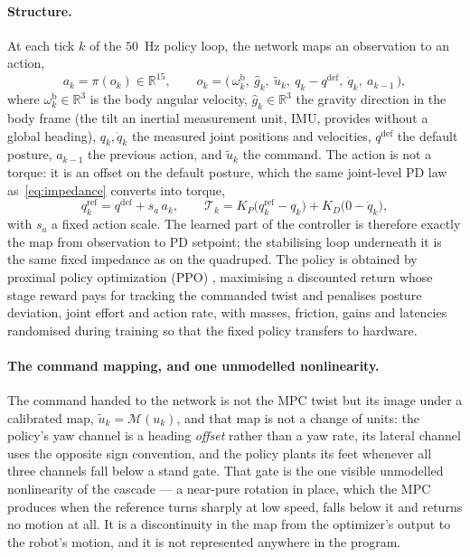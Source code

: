 \documentclass[11pt,a4paper]{article}
\newcommand{\R}{\mathbb{R}}
\newcommand{\qdef}{q^{\mathrm{def}}}
\begin{document}
\paragraph{Structure.} At each tick $k$ of the $50$~Hz policy loop, the network maps an observation to an
action,
\begin{equation}
  a_k=\pi(o_k)\in\R^{15},
  \qquad
  o_k=\big(\,\omega^{\mathrm{b}}_k,\ \hat g_k,\ \tilde u_k,\ q_k-\qdef,\ \dot q_k,\ a_{k-1}\,\big),
  \label{eq:rlpolicy}
\end{equation}
where $\omega^{\mathrm{b}}_k\in\R^3$ is the body angular velocity, $\hat g_k\in\R^3$ the gravity direction in
the body frame (the tilt an inertial measurement unit, IMU, provides without a global heading), $q_k,\dot q_k$ the
measured joint positions and velocities, $\qdef$ the default posture, $a_{k-1}$ the previous action, and
$\tilde u_k$ the command. The action is not a torque: it is an offset on the default posture, which the same
joint-level PD law as~\eqref{eq:impedance} converts into torque,
\begin{equation}
  q_k^{\mathrm{ref}}=\qdef+s_a\,a_k,
  \qquad
  \mathcal{T}_k=K_P\big(q_k^{\mathrm{ref}}-q_k\big)+K_D\big(0-\dot q_k\big),
  \label{eq:rlpd}
\end{equation}
with $s_a$ a fixed action scale. The learned part of the controller is therefore exactly the map from
observation to PD setpoint; the stabilising loop underneath it is the same fixed impedance as on the
quadruped. The policy is obtained by proximal policy optimization (PPO) \cite{schulman2017ppo}, maximising a
discounted return whose stage reward pays for tracking the commanded twist and penalises posture deviation,
joint effort and action rate, with masses, friction, gains and latencies randomised during training so that
the fixed policy transfers to hardware.

\paragraph{The command mapping, and one unmodelled nonlinearity.} The command handed to the network is not
the MPC twist but its image under a calibrated map, $\tilde u_k=\mathcal{M}(u_k)$, and that map is not a
change of units: the policy's yaw channel is a heading \emph{offset} rather than a yaw rate, its lateral
channel uses the opposite sign convention, and the policy plants its feet whenever all three channels fall
below a stand gate. That gate is the one visible unmodelled nonlinearity of the cascade --- a near-pure
rotation in place, which the MPC produces when the reference turns sharply at low speed, falls below it and
returns no motion at all. It is a discontinuity in the map from the optimizer's output to the robot's motion,
and it is not represented anywhere in the program.
\end{document}

